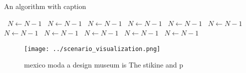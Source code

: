 \documentclass[a4paper]{article}
\begin{document}
\begin{algorithm}
\caption{An algorithm with caption}
\begin{algorithmic}
\    \State $N \gets N - 1$
\    \State $N \gets N - 1$
\    \State $N \gets N - 1$
\    \State $N \gets N - 1$
\    \State $N \gets N - 1$
\    \State $N \gets N - 1$
\    \State $N \gets N - 1$
\    \State $N \gets N - 1$
\    \State $N \gets N - 1$
\    \State $N \gets N - 1$
\    \State $N \gets N - 1$
\EndWhile
\end{algorithmic}
\end{algorithm}

\begin{figure}
\centering
\texttt{[image: ../scenario\_visualization.png]}
\caption{ mexico moda a design museum is The stikine and p
}
\end{figure}
 
\end{document}
